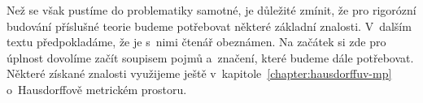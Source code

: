 Než se však pustíme do problematiky samotné, je důležité zmínit, že pro rigorózní budování příslušné teorie budeme potřebovat některé základní znalosti. V~dalším textu předpokladáme, že je s~nimi čtenář obeznámen. Na začátek si zde pro úplnost dovolíme začít soupisem pojmů a~značení, které budeme dále potřebovat. Některé získané znalosti využijeme ještě v~kapitole~\ref{chapter:hausdorffuv-mp} o~Hausdorffově metrickém prostoru.





